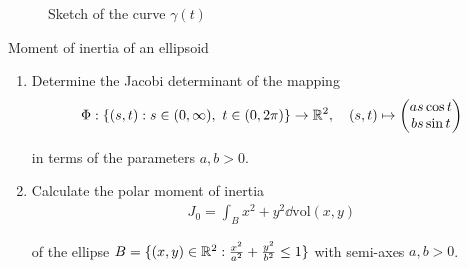 \documentclass[12pt]{article}
\begin{document}
\begin{enumerate}
\begin{figure}[htpb]
    \caption{Sketch of the curve $\gamma(t)$}
\end{figure}

\end{enumerate}

\newpage

\begin{problem}{Moment of inertia of an ellipsoid}{}
    \begin{enumerate}
        \item Determine the Jacobi determinant of the mapping
        \begin{align*}
            \Phi: \{ (s, t) : s \in (0, \infty),\ t \in (0, 2\pi) \} \rightarrow \mathbb{R}^2,\quad (s, t) \mapsto 
            \begin{pmatrix}
                as\cos t \\ bs\sin t   
            \end{pmatrix}
        \end{align*}

        in terms of the parameters $a, b > 0$.

        \item Calculate the polar moment of inertia
        \begin{align*}
            J_0 = \int_B x^2 + y^2 \dd \mathrm{vol}(x, y)
        \end{align*}

        of the ellipse $B = \{(x, y) \in \mathbb{R}^2 : \frac{x^2}{a^2} + \frac{y^2}{b^2} \leq 1\}$ with semi-axes $a, b > 0$.
    \end{enumerate}
\end{problem}
\end{document}
